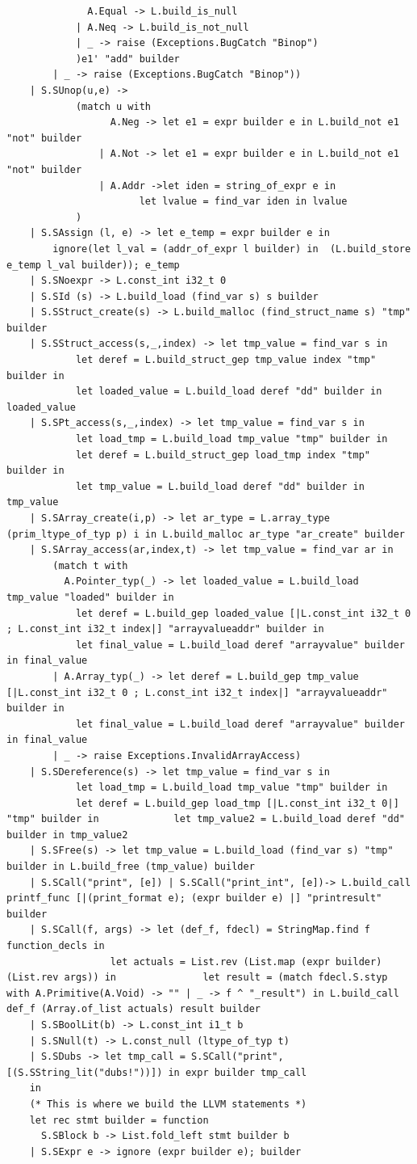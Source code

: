 \documentclass{article}
\begin{document}
\begin{lstlisting}
			  A.Equal -> L.build_is_null
			| A.Neq -> L.build_is_not_null
			| _ -> raise (Exceptions.BugCatch "Binop")
			)e1' "add" builder
		| _ -> raise (Exceptions.BugCatch "Binop")) 		 
	| S.SUnop(u,e) -> 
			(match u with
				  A.Neg -> let e1 = expr builder e in L.build_not e1 "not" builder
				| A.Not -> let e1 = expr builder e in L.build_not e1 "not" builder
				| A.Addr ->let iden = string_of_expr e in 
					   let lvalue = find_var iden in lvalue
			)
	| S.SAssign (l, e) -> let e_temp = expr builder e in 
		ignore(let l_val = (addr_of_expr l builder) in  (L.build_store e_temp l_val builder)); e_temp
	| S.SNoexpr -> L.const_int i32_t 0
	| S.SId (s) -> L.build_load (find_var s) s builder
	| S.SStruct_create(s) -> L.build_malloc (find_struct_name s) "tmp" builder
	| S.SStruct_access(s,_,index) -> let tmp_value = find_var s in 
			let deref = L.build_struct_gep tmp_value index "tmp" builder in 
			let loaded_value = L.build_load deref "dd" builder in loaded_value
	| S.SPt_access(s,_,index) -> let tmp_value = find_var s in 
			let load_tmp = L.build_load tmp_value "tmp" builder in 
			let deref = L.build_struct_gep load_tmp index "tmp" builder in 
			let tmp_value = L.build_load deref "dd" builder in tmp_value
	| S.SArray_create(i,p) -> let ar_type = L.array_type (prim_ltype_of_typ p) i in L.build_malloc ar_type "ar_create" builder 
	| S.SArray_access(ar,index,t) -> let tmp_value = find_var ar in 
		(match t with 
		  A.Pointer_typ(_) -> let loaded_value = L.build_load tmp_value "loaded" builder in  
			let deref = L.build_gep loaded_value [|L.const_int i32_t 0 ; L.const_int i32_t index|] "arrayvalueaddr" builder in 
			let final_value = L.build_load deref "arrayvalue" builder in final_value 
		| A.Array_typ(_) -> let deref = L.build_gep tmp_value [|L.const_int i32_t 0 ; L.const_int i32_t index|] "arrayvalueaddr" builder in 
			let final_value = L.build_load deref "arrayvalue" builder in final_value 
		| _ -> raise Exceptions.InvalidArrayAccess)
	| S.SDereference(s) -> let tmp_value = find_var s in 
			let load_tmp = L.build_load tmp_value "tmp" builder in 
			let deref = L.build_gep load_tmp [|L.const_int i32_t 0|] "tmp" builder in 			  let tmp_value2 = L.build_load deref "dd" builder in tmp_value2
	| S.SFree(s) -> let tmp_value = L.build_load (find_var s) "tmp" builder in L.build_free (tmp_value) builder
	| S.SCall("print", [e]) | S.SCall("print_int", [e])-> L.build_call printf_func [|(print_format e); (expr builder e) |] "printresult" builder
	| S.SCall(f, args) -> let (def_f, fdecl) = StringMap.find f function_decls in
			      let actuals = List.rev (List.map (expr builder) (List.rev args)) in 				let result = (match fdecl.S.styp with A.Primitive(A.Void) -> "" | _ -> f ^ "_result") in L.build_call def_f (Array.of_list actuals) result builder
	| S.SBoolLit(b) -> L.const_int i1_t b
	| S.SNull(t) -> L.const_null (ltype_of_typ t)
	| S.SDubs -> let tmp_call = S.SCall("print", [(S.SString_lit("dubs!"))]) in expr builder tmp_call 	
	in
	(* This is where we build the LLVM statements *)
	let rec stmt builder = function 
	  S.SBlock b -> List.fold_left stmt builder b
	| S.SExpr e -> ignore (expr builder e); builder
	

\end{lstlisting}
\end{document}
